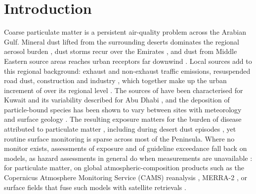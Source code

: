 \section{Introduction}

Coarse particulate matter is a persistent air-quality problem across the Arabian Gulf. Mineral
dust lifted from the surrounding deserts dominates the regional aerosol burden
\citep{gandham2020,shahid2026}, dust storms recur over the Emirates
\citep{barbulescu2020,karagulian2019}, and dust from Middle Eastern source areas reaches urban
receptors far downwind \citep{givehchi2013}. Local sources add to this regional background:
exhaust and non-exhaust traffic emissions, resuspended road dust, construction and industry
\citep{thorpe2008,amato2009,harrison2021}, which together make up the urban increment of
\pmten{} over its regional level \citep{lenschow2001}. The sources of \pmten{} have been
characterised for Kuwait \citep{hopke2026} and its variability described for Abu Dhabi
\citep{abuelgasim2020}, and the deposition of particle-bound species has been shown to vary
between sites with meteorology and surface geology \citep{bae2025be7}. The resulting exposure
matters for the burden of disease attributed to particulate matter
\citep{cohen2017,lelieveled2015,chen2020,orellano2020}, including during desert dust episodes
\citep{karanasiou2012}, yet routine surface monitoring is sparse across most of the Peninsula.
Where no monitor exists, assessments of exposure and of guideline exceedance fall back on models,
as hazard assessments in general do when measurements are unavailable \citep{shin2026resilient}:
for particulate matter, on global atmospheric-composition products such as the Copernicus
Atmosphere Monitoring Service (CAMS) reanalysis \citep{inness2019,flemming2015,morcrette2009},
MERRA-2 \citep{gelaro2017,randles2017}, or surface fields that fuse such models with satellite
retrievals \citep{van_donkelaar2016,hammer2020}.

